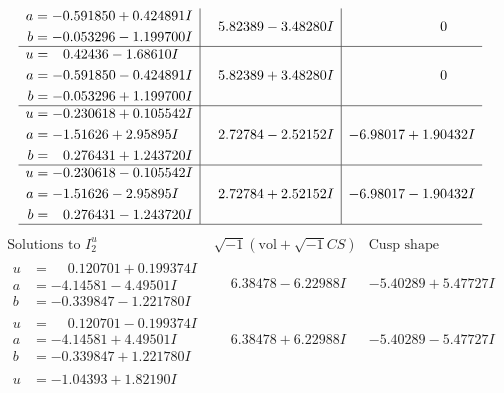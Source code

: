 \documentclass[1p]{elsarticle_modified}
\theoremstyle{definition}
\newcommand{\I}{\sqrt{-1}}
\begin{document}
$$\begin{array}{c|c|c}
\begin{aligned}
a &= -0.591850 + 0.424891 I \\
b &= -0.053296 - 1.199700 I\end{aligned}
 & \phantom{-}5.82389 - 3.48280 I & \phantom{-0.000000 } 0 \\ \hline\begin{aligned}
u &= \phantom{-}0.42436 - 1.68610 I \\
a &= -0.591850 - 0.424891 I \\
b &= -0.053296 + 1.199700 I\end{aligned}
 & \phantom{-}5.82389 + 3.48280 I & \phantom{-0.000000 } 0 \\ \hline\begin{aligned}
u &= -0.230618 + 0.105542 I \\
a &= -1.51626 + 2.95895 I \\
b &= \phantom{-}0.276431 + 1.243720 I\end{aligned}
 & \phantom{-}2.72784 - 2.52152 I & -6.98017 + 1.90432 I \\ \hline\begin{aligned}
u &= -0.230618 - 0.105542 I \\
a &= -1.51626 - 2.95895 I \\
b &= \phantom{-}0.276431 - 1.243720 I\end{aligned}
 & \phantom{-}2.72784 + 2.52152 I & -6.98017 - 1.90432 I\\
 \hline 
 \end{array}$$\newpage$$\begin{array}{c|c|c}  
\text{Solutions to }I^u_{2}& \I (\text{vol} + \sqrt{-1}CS) & \text{Cusp shape}\\
 \hline 
\begin{aligned}
u &= \phantom{-}0.120701 + 0.199374 I \\
a &= -4.14581 - 4.49501 I \\
b &= -0.339847 - 1.221780 I\end{aligned}
 & \phantom{-}6.38478 - 6.22988 I & -5.40289 + 5.47727 I \\ \hline\begin{aligned}
u &= \phantom{-}0.120701 - 0.199374 I \\
a &= -4.14581 + 4.49501 I \\
b &= -0.339847 + 1.221780 I\end{aligned}
 & \phantom{-}6.38478 + 6.22988 I & -5.40289 - 5.47727 I \\ \hline\begin{aligned}
u &= -1.04393 + 1.82190 I \\

\end{aligned}
\end{array}$$
\end{document}
